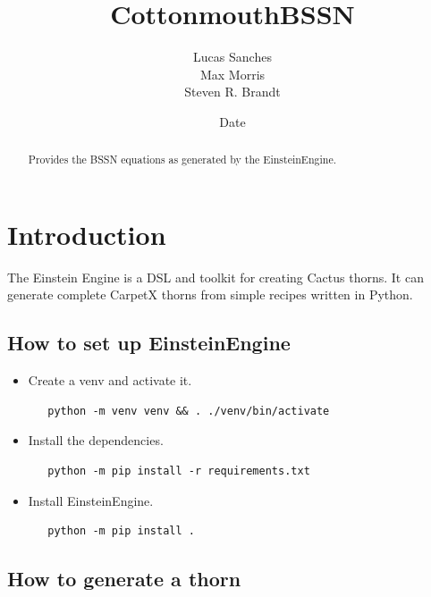 \documentclass{article}
\begin{document}
\title{CottonmouthBSSN}
\author{Lucas Sanches \\ Max Morris \\ Steven R. Brandt}
\date{$ $Date$ $}

\maketitle



\begin{abstract}
    Provides the BSSN equations as generated by the EinsteinEngine.
\end{abstract}

\section{Introduction}

The Einstein Engine is a DSL and toolkit for creating Cactus thorns.
It can generate complete CarpetX thorns from simple recipes written in Python.

\subsection{How to set up EinsteinEngine}

\begin{itemize}
   \item Create a venv and activate it. 
   \begin{verbatim}
   python -m venv venv && . ./venv/bin/activate
   \end{verbatim}
\item Install the dependencies.
   \begin{verbatim}
   python -m pip install -r requirements.txt
   \end{verbatim}

\item Install EinsteinEngine. 
   \begin{verbatim}
   python -m pip install .
   \end{verbatim}
\end{itemize}
   
\subsection{How to generate a thorn}
\end{document}
